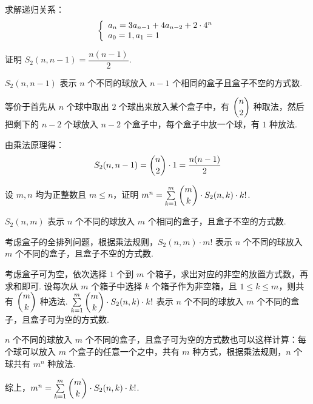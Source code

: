 \documentclass[cn, hazy, blue, normal, 12pt]{elegantnote}
\begin{document}
\begin{exercise}

    求解递归关系：
    \begin{equation}
        \notag
        \left\{\begin{array}{l}
            a_{n}=3 a_{n-1}+4 a_{n-2}+2 \cdot 4^{n} \\
            a_{0}=1, a_{1}=1
        \end{array}\right.
    \end{equation}

\end{exercise}

\begin{exercise}

    证明 $S_{2}(n, n-1) = \dfrac{n(n-1)}{2}$.

\end{exercise}

\begin{solution}[print=true]

    $S_2(n,n-1)$ 表示 $n$ 个不同的球放入 $n-1$ 个相同的盒子且盒子不空的方式数.

    等价于首先从 $n$ 个球中取出 $2$ 个球出来放入某个盒子中，有
    $\dbinom{n}{2}$
    种取法，然后把剩下的 $n-2$ 个球放入 $n-2$ 个盒子中，每个盒子中放一个球，有 $1$ 种放法.

    由乘法原理得：
    \begin{equation}
        \notag
        S_{2}(n, n-1) = \dbinom{n}{2} \cdot 1 =
        \dfrac{n(n-1)}{2}
    \end{equation}

\end{solution}

\begin{exercise}

    设 $m, n$ 均为正整数且 $m\leq n$，证明 $m^n = \sum\limits_{k=1}^{m} {\dbinom{m}{k} \cdot S_2(n,k) \cdot k!}$.

\end{exercise}

\begin{solution}[print=true]

    $S_2(n,m)$ 表示 $n$ 个不同的球放入 $m$ 个相同的盒子，且盒子不空的方式数.

    考虑盒子的全排列问题，根据乘法规则，$S_2(n,m) \cdot m!$ 表示 $n$ 个不同的球放入 $m$ 个不同的盒子，且盒子不空的方式数.

    考虑盒子可为空，依次选择 $1$ 个到 $m$ 个箱子，求出对应的非空的放置方式数，再求和即可. 设每次从 $m$ 个箱子中选择 $k$ 个箱子作为非空箱，且 $1 \leq k \leq m$，则共有 $\dbinom{m}{k}$ 种选法. $\sum\limits_{k=1}^{m} {\dbinom{m}{k} \cdot S_2(n,k) \cdot k!}$ 表示 $n$ 个不同的球放入 $m$ 个不同的盒子，且盒子可为空的方式数.

    $n$ 个不同的球放入 $m$ 个不同的盒子，且盒子可为空的方式数也可以这样计算：每个球可以放入 $m$ 个盒子的任意一个之中，共有 $m$ 种方式，根据乘法规则，$n$ 个球共有 $m^n$ 种放法.

    综上，$m^n = \sum\limits_{k=1}^{m} {\dbinom{m}{k} \cdot S_2(n,k) \cdot k!}$.

\end{solution}
\end{document}
